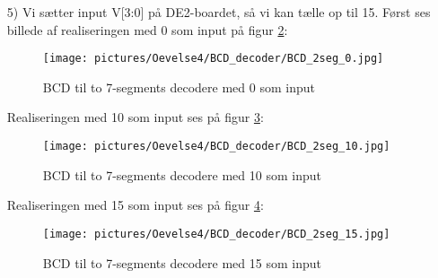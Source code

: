 \begin{enumerate}
\begin{lstlisting}[caption={BCD til to 7 segment decoder},label={lst:bcdToTwo7SegDecoder}]
			entity TwoDigitDecoder is
			port(V: in std_logic_vector(3 downto 0);
			seg1, seg10: out std_logic_vector(6 downto 0));
			end TwoDigitDecoder;
			
			architecture selection of TwoDigitDecoder is
			signal M, X: std_logic_vector(3 downto 0);
			signal Z: std_logic ;
			
			begin
			Z <= '1' when(V > "1001") else '0';
			M <= V when(Z = '0') else (std_logic_vector(unsigned(V) - 10));  
			X <= "000" & Z;
			
			seg1<="0000001" when (M = "0000") else
			"1001111" when (M = "0001") else
			"0010010" when (M = "0010") else
			"0000110" when (M = "0011") else
			"1001100" when (M = "0100") else
			"0100100" when (M = "0101") else
			"1100000" when (M = "0110") else
			"0001111" when (M = "0111") else
			"0000000" when (M = "1000") else
			"0001100" when (M = "1001") else
			"0000001" when (M = "1010") else
			"1001111" when (M = "1011") else
			"0010010" when (M = "1100") else
			"0000110" when (M = "1101") else
			"1001100" when (M = "1110") else
			"0100100" when (M = "1111") else "1111111";
			
			seg10<="0000001" when (X = "0000") else
			"1001111" when (X = "0001") else "1111111";
			
			end selection;
			\end{lstlisting}
			
	Vi kan nu lave en functional simulation i Quartus som ses på figur \ref{fig:2SegFuncSim}:
	\begin{figure}[h]
		\centering
		\texttt{[image: pictures/Oevelse4/BCD\_decoder/BCD\_2segFuncSim.jpg]}
		\caption{Functional simulation af to 7-segments decoder}
		\label{fig:2SegFuncSim}
	\end{figure}
	
	\item[5)]
	Vi sætter input V[3:0] på DE2-boardet, så vi kan tælle op til 15. Først ses billede af realiseringen med 0 som input på figur \ref{fig:2Seg0}:
	\begin{figure}[h]
		\centering
		\texttt{[image: pictures/Oevelse4/BCD\_decoder/BCD\_2seg\_0.jpg]}
		\caption{BCD til to 7-segments decodere med 0 som input}
		\label{fig:2Seg0}
	\end{figure}

Realiseringen med 10 som input ses på figur \ref{fig:2Seg10}:
	\begin{figure}[h]
		\centering
		\texttt{[image: pictures/Oevelse4/BCD\_decoder/BCD\_2seg\_10.jpg]}
		\caption{BCD til to 7-segments decodere med 10 som input}
		\label{fig:2Seg10}
	\end{figure}
	
Realiseringen med 15 som input ses på figur \ref{fig:2Seg15}:
	\begin{figure}[h]
		\centering
		\texttt{[image: pictures/Oevelse4/BCD\_decoder/BCD\_2seg\_15.jpg]}
		\caption{BCD til to 7-segments decodere med 15 som input}
		\label{fig:2Seg15}
	\end{figure}
\pagebreak

\end{enumerate}